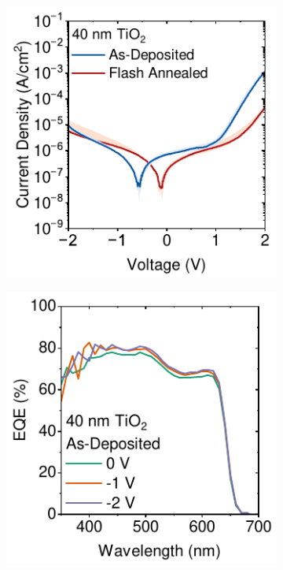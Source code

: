 \begin{figure}[htbp]
    \centering
    \begin{subfigure}[t]{0.32\textwidth}
        \centering
        \includegraphics[width=\textwidth]{chapters/material_properties/images/TiO2-Compare.pdf} 
        \caption{}
        \label{fig:ch2:tio2_compare}
    \end{subfigure}
    \hfill
    \begin{subfigure}[t]{0.32\textwidth}
        \centering
        \includegraphics[width=\textwidth]{chapters/material_properties/images/As_Dep-EQE.pdf} %

\end{subfigure}
\end{figure}
